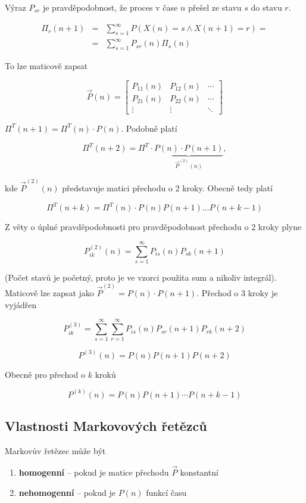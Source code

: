 Výraz $P_{sr}$ je pravděpodobnost, že proces v čase $n$ přešel ze stavu $s$ do stavu $r$.

\begin{eqnarray*}
\Pi_r(n+1) & = & \sum_{s=1}^\infty P(X(n)=s\wedge X(n+1)=r) =\\
& = & \sum_{s=1}^\infty P_{sr}(n)\Pi_s(n)
\end{eqnarray*}

To lze maticově zapsat

\[ \vec{P}(n) =
\begin{bmatrix}
P_{11}(n) & P_{12}(n) & \cdots\\
P_{21}(n) & P_{22}(n) & \cdots\\
\vdots & \vdots & \ddots
\end{bmatrix} \]

$\Pi^T(n+1)= \Pi^T(n)\cdot P(n)$. Podobně platí

\[ \Pi^T(n+2)=\Pi^T\cdot \underbrace{P(n)\cdot P(n+1)}_{\vec{P}^{(2)}(n)}, \]

kde $\vec{P}^{(2)}(n)$ představuje matici přechodu o 2 kroky. Obecně tedy platí

\[ \Pi^T(n+k)=\Pi^T(n)\cdot P(n)P(n+1)\ldots P(n+k-1) \]

Z věty o úplné pravděpodobnosti pro pravděpodobnost přechodu o 2 kroky plyne

\[ P_{ik}^{(2)}(n) = \sum_{s=1}^\infty P_{is}(n)P_{sk}(n+1) \]

(Počet stavů je početný, proto je ve vzorci použita sum a nikoliv integrál). Maticově lze zapsat jako $\vec{P}^{(2)}=P(n)\cdot P(n+1)$. Přechod o 3 kroky je vyjádřen

\[ P_{ik}^{(3)} = \sum_{s=1}^\infty \sum_{r=1}^\infty P_{is}(n)P_{sr}(n+1)P_{rk}(n+2) \]

\[ P^{(3)}(n)=P(n)P(n+1)P(n+2) \]

Obecně pro přechod o $k$ kroků

\[ P^{(k)}(n)=P(n)P(n+1)\cdots P(n+k-1) \]

\subsection{Vlastnosti Markovových řetězců}
Markovův řetězec může být

\begin{enumerate}[noitemsep]
\item \textbf{homogenní} -- pokud je matice přechodu $\vec{P}$ konstantní
\item \textbf{nehomogenní} -- pokud je $P(n)$ funkcí času
\end{enumerate}

